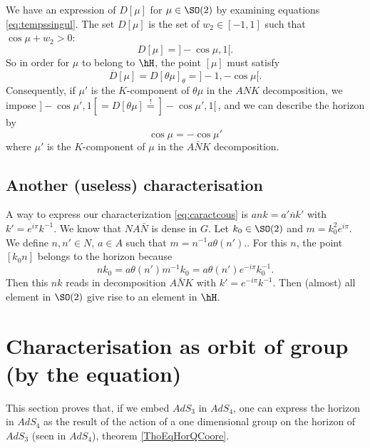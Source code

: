 We have an expression of $D[\mu]$ for $\mu\in \SO(2)$ by examining equations \eqref{eq:tempssingul}. The set $D[\mu]$ is the set of $w_2\in [-1,1]$ such that $\cos \mu+w_2>0$:
\begin{equation}
  D[\mu]=]-\cos \mu,1[.
\end{equation}
So in order for $\mu$ to belong to $\hH$, the point $[\mu]$ must satisfy
\[
\overline{D}[\mu]=D[\theta \mu]_{\theta}=]-1,-\cos \mu[.
\]
Consequently, if $\mu'$ is the $K$-component of $\theta \mu$ in the $ANK$ decomposition, we impose $]-\cos \mu',1[=D[\theta \mu]\stackrel{!}{=}]-\cos \mu',1[$\,, and we can describe the horizon by
\begin{equation} \label{eq:caractcous}
\cos \mu=-\cos \mu'
\end{equation}
where $\mu'$ is the $K$-component of $\mu$ in the $A\bar{N}K$ decomposition.


\subsection{Another (useless) characterisation}

A way to express our characterization \eqref{eq:caractcous} is $ank=a'\overline{n}k'$ with $k'=e^{i\pi}k^{-1}$. We know that $NA\bar{N}$ is dense in $G$. Let $k_0\in \SO(2)$ and $m=k_0^2e^{i\pi}$. We define $n,n'\in N$, $a\in A$ such that $m=n^{-1} a\theta(n')$.. For this $n$, the point $[k_0n]$ belongs to the horizon because
\begin{equation}
nk_0=a\theta(n')m^{-1} k_0
    =a\theta(n')e^{-i\pi}k_0^{-1}.
\end{equation}
Then this $nk$ reads in decomposition $A\bar{N}K$ with $k'=e^{-i\pi}k^{-1}$. Then (almost) all element in $\SO(2)$ give rise to an element in $\hH$.


					\section{Characterisation as orbit of group (by the equation)}
\label{SecHOrOrbEquation}

This section proves that, if we embed $AdS_3$ in $AdS_4$, one can express the horizon in $AdS_4$ as the result of the action of a one dimensional group on the horizon of $AdS_3$ (seen in $AdS_4$), theorem \ref{ThoEqHorQCoore}.

